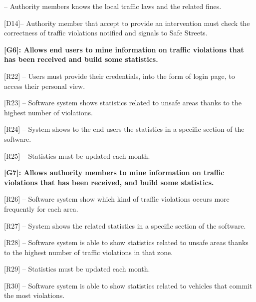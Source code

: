 \documentclass[12pt]{article}
\begin{document}
\begin{flushleft}
[D13]-- Authority members knows the local traffic laws and the related fines.
\vspace{2mm}

[D14]-- Authority member that accept to provide an intervention must check the correctness of traffic violations notified and signals to Safe Streets.
\vspace{2mm}


\vspace{4mm}
\textbf{[G6]: Allows end users to mine information on traffic violations that has been received and build some statistics.}
\vspace{2mm}

[R22] -- Users must provide their credentials, into the form of login page, to access their personal view.
\vspace{2mm}

[R23] – Software system  shows statistics related to unsafe areas thanks to the highest number of violations.
\vspace{2mm}

[R24] –  System shows to the end users the statistics in a specific section of the software.
\vspace{2mm}

[R25] –  Statistics must be updated each month.
\vspace{2mm}

\vspace{4mm}
\textbf{ [G7]: Allows authority members to mine information on traffic violations that has been received, and build some statistics.}
\vspace{2mm}

[R26] -- Software system show which kind of traffic violations occurs more frequently for each area.
\vspace{2mm}

[R27] – System shows the related statistics in a specific section of the software.
\vspace{2mm}

[R28] – Software system is able to show statistics related to unsafe areas thanks to the highest number of traffic violations in that zone.
\vspace{2mm}

[R29] –  Statistics must be updated each month.
\vspace{2mm}

[R30] – Software system is able to show statistics related to vehicles that commit the most violations.
\vspace{2mm}


\end{flushleft}
\end{document}

